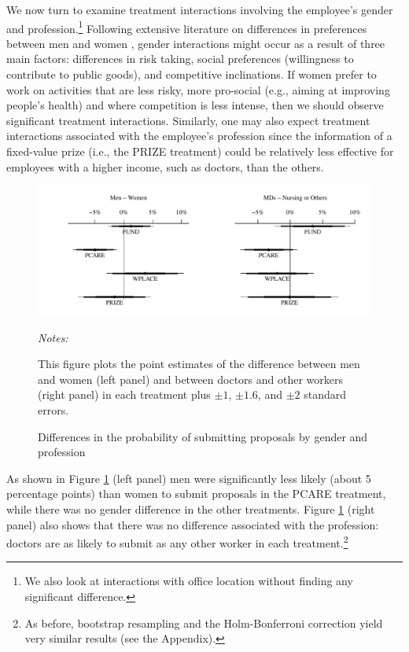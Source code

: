 \documentclass[12pt, titlepage]{article}
\newenvironment{tablenotes}[1][]{
  \begin{minipage}{\textwidth}\emph{Notes:}{\footnotesize #1}
}{\end{minipage}}
\begin{document}
We now turn to examine treatment interactions involving the employee's
gender and profession.\footnote{We also look at interactions with office
  location without finding any significant difference.} Following
extensive literature on differences in preferences between men and women
\citep{croson2009gender}, gender interactions might occur as a result of
three main factors: differences in risk taking, social preferences
(willingness to contribute to public goods), and competitive
inclinations. If women prefer to work on activities that are less risky,
more pro-social (e.g., aiming at improving people's health) and where
competition is less intense, then we should observe significant
treatment interactions. Similarly, one may also expect treatment
interactions associated with the employee's profession since the
information of a fixed-value prize (i.e., the PRIZE treatment) could be
relatively less effective for employees with a higher income, such as
doctors, than the others.

\begin{figure} 
  \centering
  \caption{Differences in the probability of submitting proposals by gender and profession}
  \label{fig: interactions}
  \includegraphics{Figures/plot-gender-1.pdf}
  \begin{tablenotes}
  This figure plots the point estimates of the difference between men and women (left panel) and between doctors and other workers (right panel) in each treatment plus $\pm 1$, $\pm 1.6$, and $\pm 2$ standard errors.%
  \end{tablenotes}
\end{figure}

As shown in Figure \ref{fig: interactions} (left panel) men were
significantly less likely (about 5 percentage points) than women to
submit proposals in the PCARE treatment, while there was no gender
difference in the other treatments. Figure \ref{fig: interactions}
(right panel) also shows that there was no difference associated with
the profession: doctors are as likely to submit as any other worker in
each treatment.\footnote{As before, bootstrap resampling and the
  Holm-Bonferroni correction yield very similar results (see the
  Appendix).}
\end{document}
